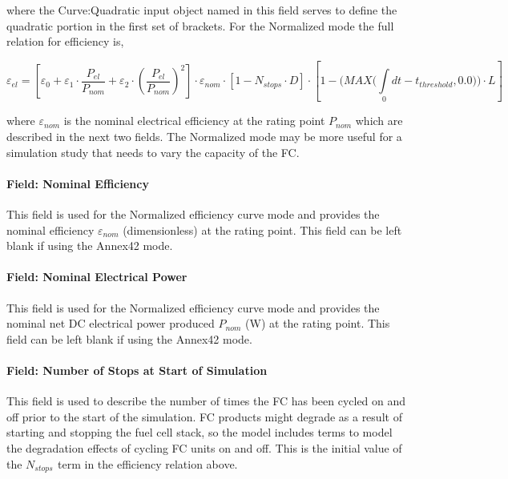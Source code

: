 where the Curve:Quadratic input object named in this field serves to define the quadratic portion in the first set of brackets. For the Normalized mode the full relation for efficiency is,

\begin{equation}
{\varepsilon_{el}} = \left[ {{\varepsilon_0} + {\varepsilon_1} \cdot \frac{{{P_{el}}}}{{{P_{nom}}}} + {\varepsilon_2} \cdot {{\left( {\frac{{{P_{el}}}}{{{P_{nom}}}}} \right)}^2}} \right] \cdot {\varepsilon_{nom}} \cdot \left[ {1 - {N_{stops}} \cdot D} \right] \cdot \left[ {1 - (MAX(\int\limits_0 {dt - {t_{threshold}},0.0))}  \cdot L} \right]
\end{equation}

where \({\varepsilon_{nom}}\) is the nominal electrical efficiency at the rating point \({P_{nom}}\) which are described in the next two fields. The Normalized mode may be more useful for a simulation study that needs to vary the capacity of the FC.

\paragraph{Field: Nominal Efficiency}\label{field-nominal-efficiency}

This field is used for the Normalized efficiency curve mode and provides the nominal efficiency \({\varepsilon_{nom}}\) (dimensionless) at the rating point. This field can be left blank if using the Annex42 mode.

\paragraph{Field: Nominal Electrical Power}\label{field-nominal-electrical-power}

This field is used for the Normalized efficiency curve mode and provides the nominal net DC electrical power produced \({P_{nom}}\) (W) at the rating point. This field can be left blank if using the Annex42 mode.

\paragraph{Field: Number of Stops at Start of Simulation}\label{field-number-of-stops-at-start-of-simulation}

This field is used to describe the number of times the FC has been cycled on and off prior to the start of the simulation. FC products might degrade as a result of starting and stopping the fuel cell stack, so the model includes terms to model the degradation effects of cycling FC units on and off. This is the initial value of the \({N_{stops}}\) \emph{\(_{}\)}term in the efficiency relation above.

